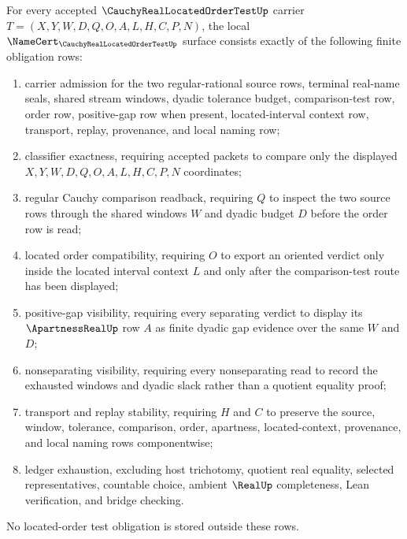 \begin{theorem}
\label{thm:cauchy-real-located-order-test-namecert-obligations}
For every accepted $\CauchyRealLocatedOrderTestUp$ carrier $T=(X,Y,W,D,Q,O,A,L,H,C,P,N)$, the local $\NameCert_{\CauchyRealLocatedOrderTestUp}$ surface consists exactly of the following finite obligation rows:
\begin{enumerate}
\item carrier admission for the two regular-rational source rows, terminal real-name seals, shared stream windows, dyadic tolerance budget, comparison-test row, order row, positive-gap row when present, located-interval context row, transport, replay, provenance, and local naming row;
\item classifier exactness, requiring accepted packets to compare only the displayed $X,Y,W,D,Q,O,A,L,H,C,P,N$ coordinates;
\item regular Cauchy comparison readback, requiring $Q$ to inspect the two source rows through the shared windows $W$ and dyadic budget $D$ before the order row is read;
\item located order compatibility, requiring $O$ to export an oriented verdict only inside the located interval context $L$ and only after the comparison-test route has been displayed;
\item positive-gap visibility, requiring every separating verdict to display its $\ApartnessRealUp$ row $A$ as finite dyadic gap evidence over the same $W$ and $D$;
\item nonseparating visibility, requiring every nonseparating read to record the exhausted windows and dyadic slack rather than a quotient equality proof;
\item transport and replay stability, requiring $H$ and $C$ to preserve the source, window, tolerance, comparison, order, apartness, located-context, provenance, and local naming rows componentwise;
\item ledger exhaustion, excluding host trichotomy, quotient real equality, selected representatives, countable choice, ambient $\RealUp$ completeness, Lean verification, and bridge checking.
\end{enumerate}
No located-order test obligation is stored outside these rows.
\end{theorem}
